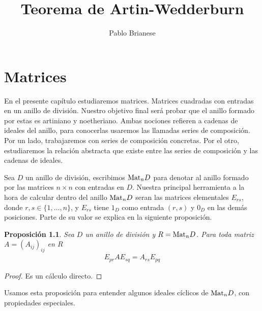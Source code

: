 \documentclass{report}
\title{Teorema de Artin-Wedderburn}
\author{Pablo Brianese}
\newcommand{\Mat}{\textnormal{Mat}}
\newtheorem{proposition}{Proposición}
\begin{document}
  \maketitle
  \tableofcontents
  \chapter{Matrices}

  En el presente capítulo estudiaremos matrices.
  Matrices cuadradas con entradas en un anillo de división.
  Nuestro objetivo final será probar que el anillo formado por estas es artiniano y noetheriano.
  Ambas nociones refieren a cadenas de ideales del anillo, para conocerlas usaremos las llamadas series de composición.
  Por un lado, trabajaremos con series de composición concretas.
  Por el otro, estudiaremos la relación abstracta que existe entre las series de composición y las cadenas de ideales.

  Sea \(D\) un anillo de división, escribimos \(\Mat_n D\) para denotar al anillo formado por las matrices \(n \times n\) con entradas en \(D\).
  Nuestra principal herramienta a la hora de calcular dentro del anillo \(\Mat_n D\) seran las matrices elementales \(E_{r s}\), donde \(r, s \in \{1, \dots, n\}\), y \(E_{r s}\) tiene \(1_D\) como entrada \((r, s)\) y \(0_D\) en las demás posiciones.
  Parte de su valor se explica en la siguiente proposición.
  \begin{proposition}\label{proposition:matrixEntryCalculation}
    Sea \(D\) un anillo de división y \(R = \Mat_n D\).
    Para toda matriz \(A = {(A_{i j})}_{i j}\) en \(R\)
    \begin{align}
      E_{p r} A E_{s q}
      =
      A_{r s} E_{p q}
    \end{align}
  \end{proposition}
  \begin{proof}
    Es un cálculo directo.
  \end{proof}

  Usamos esta proposición para entender algunos ideales cíclicos de \(\Mat_n D\), con propiedades especiales.
\end{document}
